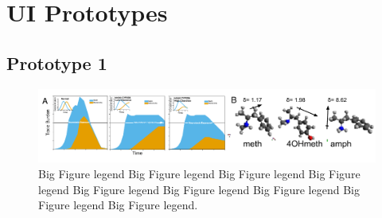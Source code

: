 \chapter{UI Prototypes}\label{UI Prototypes}

\section{Prototype 1}

\begin{figure}[h] %
       \centering
       \includegraphics[scale = .80]{Figures/Fig2.pdf}
       \caption{\footnotesize Big Figure legend Big Figure legend Big Figure legend Big Figure legend Big Figure legend Big Figure legend Big Figure legend Big Figure legend Big Figure legend.}
       \label{fig2}
\end{figure}

